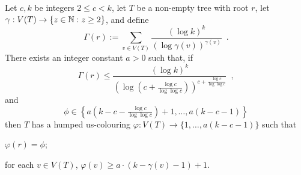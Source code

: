 \documentclass[kpfonts]{patmorin}
\begin{document}
\begin{lem}\label{tree-slack}
Let $c,k$ be integers $2\le c< k$, let $T$ be a non-empty tree with root $r$,  let $\gamma:V(T)\to\{z\in\mathbb{N}: z\ge 2\}$, and define
\[
    \Gamma(r):=\sum_{v\in V(T)} \frac{(\log k)^k}{(\log \gamma(v))^{\gamma(v)}} \enspace .
\]
There exists an integer constant $a>0$ such that,
if
\begin{equation}
     \Gamma(r) \le \frac{(\log k)^k}{\left(\log \left(c+\tfrac{\log c}{\log\log c}\right)\right)^{c+\tfrac{\log c}{\log\log c}}} \enspace , \label{total-weight-i}
\end{equation}
and
\begin{equation}
    \phi\in\left\{a\left(k-c-\tfrac{\log c}{\log\log c}\right)+1,\ldots,a(k-c-1)\right\} \label{phi-bound}
\end{equation}
then $T$ has a humped us-colouring $\varphi:V(T)\to\{1,\ldots,a(k-c-1)\}$ such that
\begin{compactenum}[(P1)]
    \item $\varphi(r)=\phi$;
    \item for each $v\in V(T)$, $\varphi(v)\ge a\cdot(k-\gamma(v)-1)+1$.
\end{compactenum}
\end{lem}
\end{document}
